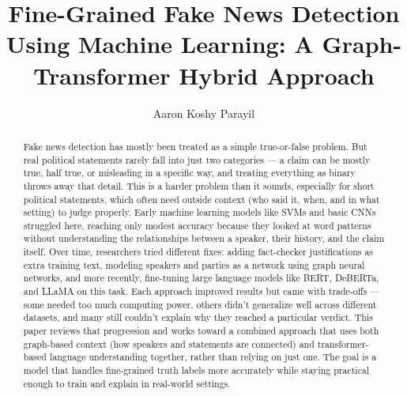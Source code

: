 \documentclass[a4paper,fleqn]{cas-sc}
\begin{document}
\let\WriteBookmarks\relax
\def\floatpagepagefraction{1}
\def\textpagefraction{.001}



\title [mode = title]{Fine-Grained Fake News Detection Using Machine Learning: A Graph-Transformer Hybrid Approach}  

\author[1]{Aaron Koshy Parayil}

\cormark[1]
\fnmark[1]


\begin{abstract}
Fake news detection has mostly been treated as a simple true-or-false problem. But real political statements rarely fall into just two categories — a claim can be mostly true, half true, or misleading in a specific way, and treating everything as binary throws away that detail. This is a harder problem than it sounds, especially for short political statements, which often need outside context (who said it, when, and in what setting) to judge properly. Early machine learning models like SVMs and basic CNNs struggled here, reaching only modest accuracy because they looked at word patterns without understanding the relationships between a speaker, their history, and the claim itself. Over time, researchers tried different fixes: adding fact-checker justifications as extra training text, modeling speakers and parties as a network using graph neural networks, and more recently, fine-tuning large language models like BERT, DeBERTa, and LLaMA on this task. Each approach improved results but came with trade-offs — some needed too much computing power, others didn't generalize well across different datasets, and many still couldn't explain why they reached a particular verdict. This paper reviews that progression and works toward a combined approach that uses both graph-based context (how speakers and statements are connected) and transformer-based language understanding together, rather than relying on just one. The goal is a model that handles fine-grained truth labels more accurately while staying practical enough to train and explain in real-world settings.
\end{abstract}
\end{document}
